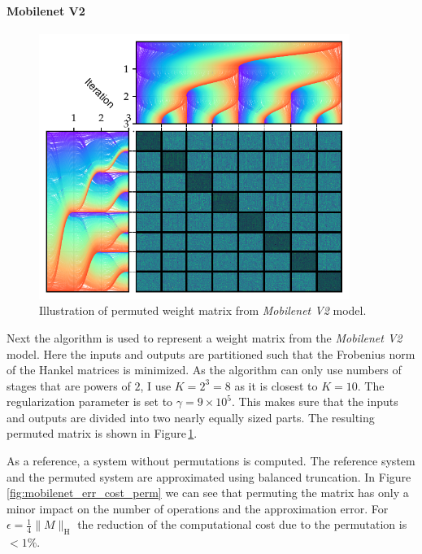 \documentclass[numbers=noenddot,doctype=mastersthesis,BCOR=15mm,biblatex]{ldvbook}%
\begin{document}
\paragraph{Mobilenet V2}
\begin{figure}[!htb]
	\centering
	\includegraphics[width=0.9\textwidth]{Plots/Mobilenet_permute.pdf}
	\caption{Illustration of permuted weight matrix from \emph{Mobilenet V2} model.
	}
	\label{fig:mobilenet_permutation}
\end{figure}
Next the algorithm is used to represent a weight matrix from the \emph{Mobilenet V2} model.
Here the inputs and outputs are partitioned such that the Frobenius norm of the Hankel matrices is minimized.
As the algorithm can only use numbers of stages that are powers of $2$, I use $K=2^3=8$ as it is closest to $K=10$.
The regularization parameter is set to $\gamma=9\times10^5$.
This makes sure that the inputs and outputs are divided into two nearly equally sized parts.
The resulting permuted matrix is shown in Figure\,\ref{fig:mobilenet_permutation}.

As a reference, a system without permutations is computed.
The reference system and the permuted system are approximated using balanced truncation.
In Figure\,\ref{fig:mobilenet_err_cost_perm} we can see that permuting the matrix has only a minor impact on the number of operations and the approximation error.
For $\epsilon = \frac{1}{4}\|M\|_\text{H}$ the reduction of the computational cost due to the permutation is $<1\%$.
\end{document}
